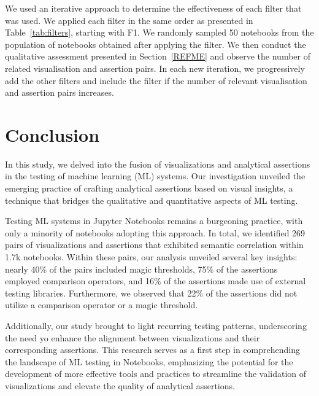 \documentclass[conference]{IEEEtran}
\begin{document}
We used an iterative approach to determine the effectiveness of each filter that was used. We applied each filter in the same order as presented in Table~\ref{tab:filters}, starting with F1. We randomly sampled 50 notebooks from the population of notebooks obtained after applying the filter. We then conduct the qualitative assessment presented in Section~\ref{REFME} and observe the number of related visualisation and assertion pairs. In each new iteration, we progressively add the other filters and include the filter if the number of relevant visualisation and assertion pairs increases.


\section{Conclusion}\label{sec:conclude}


In this study, we delved into the fusion of visualizations and analytical assertions in the testing of machine learning (ML) systems. Our investigation unveiled the emerging practice of crafting analytical assertions based on visual insights, a technique that bridges the qualitative and quantitative aspects of ML testing.

Testing ML systems in Jupyter Notebooks remains a burgeoning practice, with only a minority of notebooks adopting this approach. In total, we identified 269 pairs of visualizations and assertions that exhibited semantic correlation within 1.7k notebooks. Within these pairs, our analysis unveiled several key insights: nearly 40\% of the pairs included magic thresholds, 75\% of the assertions employed comparison operators, and 16\% of the assertions made use of external testing libraries. Furthermore, we observed that 22\% of the assertions did not utilize a comparison operator or a magic threshold.

Additionally, our study brought to light recurring testing patterns, underscoring the need yo enhance the alignment between visualizations and their corresponding assertions.
This research serves as a first step in comprehending the landscape of ML testing in Notebooks, emphasizing the potential for the development of more effective tools and practices to streamline the validation of visualizations and elevate the quality of analytical assertions.
\end{document}
